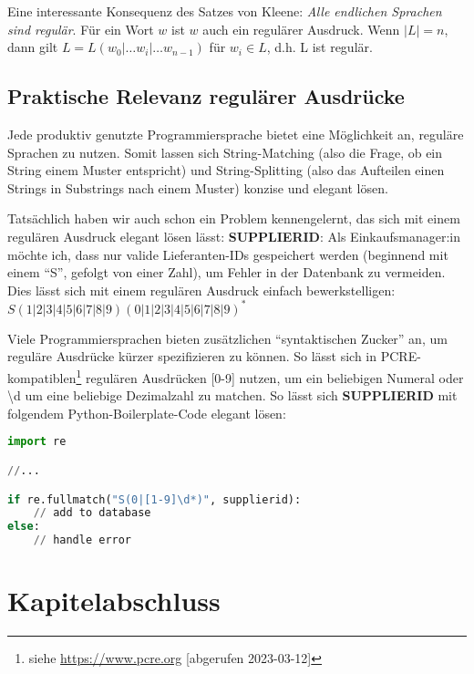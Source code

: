 Eine interessante Konsequenz des Satzes von Kleene:
\emph{Alle endlichen Sprachen sind regulär}.
Für ein Wort $w$ ist $w$ auch ein regulärer Ausdruck.
Wenn $|L| = n$, dann gilt $L = L(w_0|\dots{}w_i|\dots{}w_{n-1})$ für $w_i \in L$, d.h. L ist regulär.

\subsection{Praktische Relevanz regulärer Ausdrücke}

Jede produktiv genutzte Programmiersprache bietet eine Möglichkeit an,
reguläre Sprachen zu nutzen.
Somit lassen sich String-Matching (also die Frage, ob ein String einem Muster entspricht)
und String-Splitting (also das Aufteilen einen Strings in Substrings nach einem Muster)
konzise und elegant lösen.

Tatsächlich haben wir auch schon ein Problem kennengelernt,
das sich mit einem regulären Ausdruck elegant lösen lässt: \textbf{SUPPLIERID}:
Als Einkaufsmanager:in möchte ich,
        dass nur valide Lieferanten-IDs gespeichert werden
        (beginnend mit einem ``S'', gefolgt von einer Zahl),
        um Fehler in der Datenbank zu vermeiden.
Dies lässt sich mit einem regulären Ausdruck einfach bewerkstelligen:
$S(1|2|3|4|5|6|7|8|9)(0|1|2|3|4|5|6|7|8|9)^*$

Viele Programmiersprachen bieten zusätzlichen ``syntaktischen Zucker'' an,
um reguläre Ausdrücke kürzer spezifizieren zu können.
So lässt sich in PCRE-kompatiblen\footnote{
    siehe \href{https://www.pcre.org/}{https://www.pcre.org} [abgerufen 2023-03-12]}
regulären Ausdrücken [0-9] nutzen, um ein beliebigen Numeral 
oder \textbackslash{}d um eine beliebige Dezimalzahl zu matchen.
So lässt sich \textbf{SUPPLIERID} mit folgendem Python-Boilerplate-Code elegant lösen:

\begin{lstlisting}[language=Python, caption=Python-Boilerplate für \textbf{SUPPLIERID}]
import re

//...

if re.fullmatch("S(0|[1-9]\d*)", supplierid):
    // add to database
else:
    // handle error
\end{lstlisting}

\section*{Kapitelabschluss}
